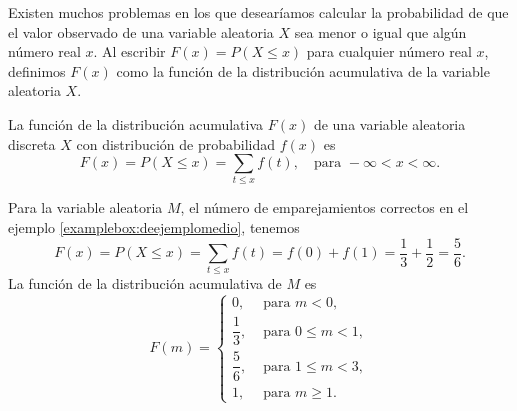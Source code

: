\newpage

Existen muchos problemas en los que desearíamos calcular la probabilidad de que el valor observado de una variable aleatoria $X$ sea menor o igual que algún número real $x$. Al escribir $F(x) = P(X \leq x)$ para cualquier número real $x$, definimos $F(x)$ como la función de la distribución acumulativa de la variable aleatoria $X$.

\begin{definicion}{}{}
    La función de la distribución acumulativa $F(x)$ de una variable aleatoria discreta $X$ con distribución de probabilidad $f(x)$ es
    $$F(x) = P(X \leq x) = \sum_{t \leq x} f(t), \quad \text{para } - \infty < x < \infty .$$
\end{definicion}

Para la variable aleatoria $M$, el número de emparejamientos correctos en el ejemplo \ref{examplebox:deejemplomedio}, tenemos
$$F(x) = P(X \leq x) = \sum_{t \leq x} f(t) = f(0) + f(1) = \frac{1}{3} + \frac{1}{2} = \frac{5}{6}.$$
La función de la distribución acumulativa de $M$ es
$$F(m) = \begin{cases}
    0, & \text{ para } m < 0, \\
    \dfrac{1}{3}, & \text{ para } 0 \leq m < 1, \\[2mm]
    \dfrac{5}{6}, & \text{ para } 1 \leq m < 3, \\
    1, & \text{ para } m \geq 1.
\end{cases}$$

